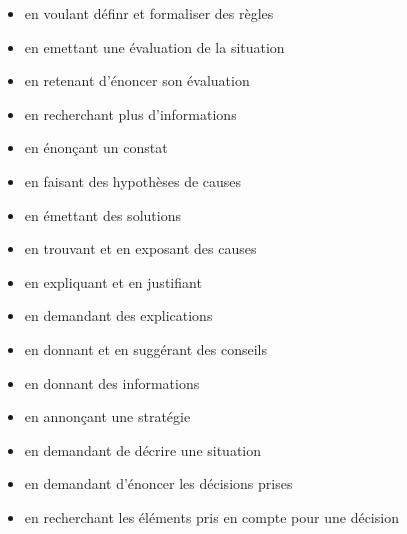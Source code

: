 \documentclass[8pt,a4paper]{article}
\begin{document}
\begin{itemize}
\begin{itemize}
\item en voulant définr et formaliser des règles  
\item en emettant une évaluation de la situation  
\item en retenant d'énoncer son évaluation  
\item en recherchant plus d'informations  
\item en énonçant un constat
\item en faisant des hypothèses de causes
\item en émettant des solutions
\item en trouvant et en exposant des causes  
\item en expliquant et en justifiant
\item en demandant des explications
\item en donnant et en suggérant des conseils  
\item en donnant des informations
\item en annonçant une stratégie  
\item en demandant de décrire une situation  
\item en demandant d'énoncer les décisions prises  
\item en recherchant les éléments pris en compte pour une décision
\\ 
 \end{itemize}
\end{itemize}
\end{document}
